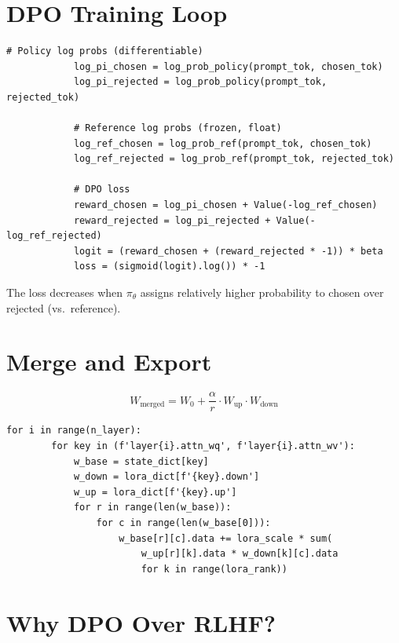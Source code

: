 \documentclass[11pt,a4paper]{article}
\begin{document}
\section{DPO Training Loop}

\begin{lstlisting}[firstnumber=358]
            # Policy log probs (differentiable)
            log_pi_chosen = log_prob_policy(prompt_tok, chosen_tok)
            log_pi_rejected = log_prob_policy(prompt_tok, rejected_tok)

            # Reference log probs (frozen, float)
            log_ref_chosen = log_prob_ref(prompt_tok, chosen_tok)
            log_ref_rejected = log_prob_ref(prompt_tok, rejected_tok)

            # DPO loss
            reward_chosen = log_pi_chosen + Value(-log_ref_chosen)
            reward_rejected = log_pi_rejected + Value(-log_ref_rejected)
            logit = (reward_chosen + (reward_rejected * -1)) * beta
            loss = (sigmoid(logit).log()) * -1
\end{lstlisting}

The loss decreases when $\pi_\theta$ assigns relatively higher probability to chosen over rejected (vs.\ reference).

\section{Merge and Export}

\[
W_{\text{merged}} = W_0 + \frac{\alpha}{r} \cdot W_{\text{up}} \cdot W_{\text{down}}
\]

\begin{lstlisting}[firstnumber=399]
    for i in range(n_layer):
        for key in (f'layer{i}.attn_wq', f'layer{i}.attn_wv'):
            w_base = state_dict[key]
            w_down = lora_dict[f'{key}.down']
            w_up = lora_dict[f'{key}.up']
            for r in range(len(w_base)):
                for c in range(len(w_base[0])):
                    w_base[r][c].data += lora_scale * sum(
                        w_up[r][k].data * w_down[k][c].data
                        for k in range(lora_rank))
\end{lstlisting}

\section{Why DPO Over RLHF?}
\end{document}
